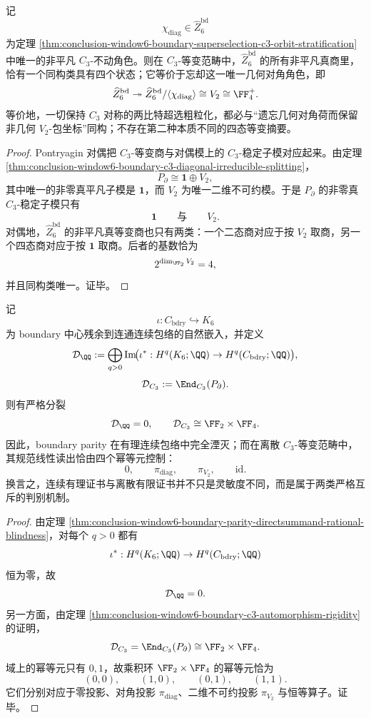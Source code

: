 \begin{theorem}\label{thm:conclusion-window6-boundary-unique-fourstate-equivariant-coarsegraining}
记
\[
\chi_{\mathrm{diag}}\in \widehat Z_6^{\mathrm{bd}}
\]
为定理 \ref{thm:conclusion-window6-boundary-superselection-c3-orbit-stratification} 中唯一的非平凡 \(C_3\)-不动角色。则在 \(C_3\)-等变范畴中，\(\widehat Z_6^{\mathrm{bd}}\) 的所有非平凡真商里，恰有一个同构类具有四个状态；它等价于忘却这一唯一几何对角角色，即
\[
\widehat Z_6^{\mathrm{bd}}
\twoheadrightarrow
\widehat Z_6^{\mathrm{bd}}/\langle \chi_{\mathrm{diag}}\rangle
\cong
V_2
\cong
\FF_4^+.
\]
等价地，一切保持 \(C_3\) 对称的两比特超选粗粒化，都必与“遗忘几何对角荷而保留非几何 \(V_2\)-包坐标”同构；不存在第二种本质不同的四态等变摘要。
\end{theorem}
\begin{proof}
Pontryagin 对偶把 \(C_3\)-等变商与对偶模上的 \(C_3\)-稳定子模对应起来。由定理 \ref{thm:conclusion-window6-boundary-c3-diagonal-irreducible-splitting}，
\[
P_{\partial}\cong \mathbf 1\oplus V_2,
\]
其中唯一的非零真平凡子模是 \(\mathbf 1\)，而 \(V_2\) 为唯一二维不可约模。于是 \(P_{\partial}\) 的非零真 \(C_3\)-稳定子模只有
\[
\mathbf 1
\qquad\text{与}\qquad
V_2.
\]
对偶地，\(\widehat Z_6^{\mathrm{bd}}\) 的非平凡真等变商也只有两类：一个二态商对应于按 \(V_2\) 取商，另一个四态商对应于按 \(\mathbf 1\) 取商。后者的基数恰为
\[
2^{\dim_{\FF_2}V_2}=4,
\]
并且同构类唯一。证毕。
\end{proof}

\begin{theorem}\label{thm:conclusion-window6-boundary-continuous-discrete-detector-splitting}
记
\[
\iota:C_{\mathrm{bdry}}\hookrightarrow K_6
\]
为 boundary 中心残余到连通连续包络的自然嵌入，并定义
\[
\mathcal D_{\QQ}
:=
\bigoplus_{q>0}
\operatorname{Im}\!\bigl(\iota^*:H^q(K_6;\QQ)\to H^q(C_{\mathrm{bdry}};\QQ)\bigr),
\]
\[
\mathcal D_{C_3}:=\End_{C_3}(P_{\partial}).
\]
则有严格分裂
\[
\mathcal D_{\QQ}=0,
\qquad
\mathcal D_{C_3}\cong \FF_2\times \FF_4.
\]
因此，boundary parity 在有理连续包络中完全湮灭；而在离散 \(C_3\)-等变范畴中，其规范线性读出恰由四个幂等元控制：
\[
0,\qquad \pi_{\mathrm{diag}},\qquad \pi_{V_2},\qquad \mathrm{id}.
\]
换言之，连续有理证书与离散有限证书并不只是灵敏度不同，而是属于两类严格互斥的判别机制。
\end{theorem}
\begin{proof}
由定理 \ref{thm:conclusion-window6-boundary-parity-directsummand-rational-blindness}，对每个 \(q>0\) 都有
\[
\iota^*:H^q(K_6;\QQ)\to H^q(C_{\mathrm{bdry}};\QQ)
\]
恒为零，故
\[
\mathcal D_{\QQ}=0.
\]
另一方面，由定理 \ref{thm:conclusion-window6-boundary-c3-automorphism-rigidity} 的证明，
\[
\mathcal D_{C_3}=\End_{C_3}(P_{\partial})\cong \FF_2\times \FF_4.
\]
域上的幂等元只有 \(0,1\)，故乘积环 \(\FF_2\times \FF_4\) 的幂等元恰为
\[
(0,0),\qquad (1,0),\qquad (0,1),\qquad (1,1).
\]
它们分别对应于零投影、对角投影 \(\pi_{\mathrm{diag}}\)、二维不可约投影 \(\pi_{V_2}\) 与恒等算子。证毕。
\end{proof}

